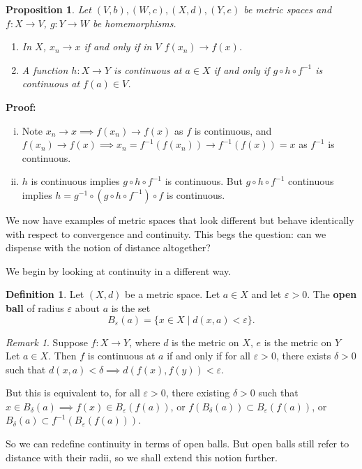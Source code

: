 \documentclass[12pt]{article}
\newtheorem{proposition}{Proposition}[section]
\theoremstyle{definition}
\newtheorem{definition}{Definition}[section]
\theoremstyle{remark}
\newtheorem*{remark}{Remark}
\begin{document}
\begin{proposition}
	Let $(V, b), (W, c), (X, d), (Y, e)$ be metric spaces and $f : X \to V$, $g : Y \to W$ be homemorphisms.
	\begin{enumerate}[\normalfont(i)]
		\item In $X$, $x_n \to x$ if and only if in $V$ $f(x_n) \to f(x)$.
		\item A function $h : X \to Y$ is continuous at $a \in X$ if and only if $g \circ h \circ f^{-1}$ is continuous at $f(a) \in V$.
	\end{enumerate}
\end{proposition}

\begin{adjustbox}{minipage = \columnwidth - 25.5pt, margin=1em, frame=1pt, margin=0em}
\textbf{Proof:}
\begin{enumerate}[(i)]
	\item Note $x_n \to x \implies f(x_n) \to f(x)$ as $f$ is continuous, and $f(x_n) \to f(x) \implies x_n = f^{-1}(f(x_n)) \to f^{-1}(f(x)) = x$ as $f^{-1}$ is continuous.
	\item $h$ is continuous implies $g \circ h \circ f^{-1}$ is continuous. But $g \circ h \circ f^{-1}$ continuous implies $h = g^{-1} \circ( g \circ h \circ f^{-1}) \circ f$ is continuous.
\end{enumerate}
\end{adjustbox}

We now have examples of metric spaces that look different but behave identically with respect to convergence and continuity. This begs the question: can we dispense with the notion of distance altogether?

We begin by looking at continuity in a different way.

\begin{definition}
	Let $(X, d)$ be a metric space. Let $a \in X$ and let $\varepsilon > 0$. The \textbf{open ball} of radius $\varepsilon$ about $a$ is the set
	\[
		B_{\varepsilon}(a) = \{x \in X \mid d(x, a) < \varepsilon\}
	.\]
\end{definition}

\begin{remark}
	Suppose $f : X \to Y$, where $d$ is the metric on $X$, $e$ is the metric on $Y$ Let $a \in X$. Then $f$ is continuous at $a$ if and only if for all $\varepsilon > 0$, there exists $\delta > 0$ such that $d(x, a) < \delta \implies d(f(x), f(y)) < \varepsilon$.

	But this is equivalent to, for all $\varepsilon > 0$, there existing $\delta > 0$ such that $x \in B_{\delta}(a) \implies f(x) \in B_{\varepsilon}(f(a))$, or $f(B_{\delta}(a)) \subset B_{\varepsilon}(f(a))$, or $B_{\delta}(a) \subset f^{-1}(B_{\varepsilon}(f(a)))$.

	So we can redefine continuity in terms of open balls. But open balls still refer to distance with their radii, so we shall extend this notion further.
\end{remark}
\end{document}
